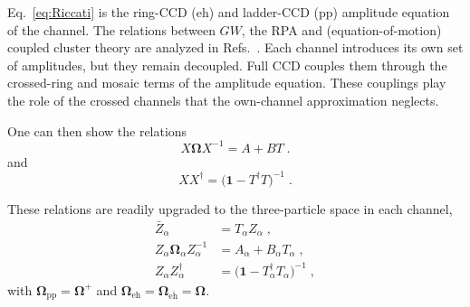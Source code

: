 \documentclass[aip,jcp,reprint,noshowkeys,superscriptaddress]{revtex4-1}
\newcommand{\bI}{\boldsymbol{1}}
\newcommand{\eh}{\text{eh}}
\newcommand{\teh}{\overline{\text{eh}}}
\newcommand{\pp}{\text{pp}}
\begin{document}
Eq.~\eqref{eq:Riccati} is
the ring-CCD ($\eh$) and ladder-CCD ($\pp$) amplitude equation of the
channel.\cite{Scuseria2013} The relations between $GW$, the RPA and
(equation-of-motion) coupled cluster theory are analyzed in
Refs.~.
Each channel introduces its own set of
amplitudes, but they remain decoupled.
Full CCD couples them through the
crossed-ring and mosaic terms of the amplitude
equation.\cite{Shepherd2014}
These couplings play the role of the crossed channels
that the own-channel approximation neglects.

One can then show the relations
\begin{equation}
X\boldsymbol\Omega X^{-1}
=
A+B T \;.
\label{eq:ZOmegaZ}
\end{equation}
and
\begin{equation}
XX^\dagger
=
\big(\bI-T^\dagger T\big)^{-1} \;.
\label{eq:X_norm}
\end{equation}

These relations are readily upgraded to the three-particle space 
in each channel,
\begin{equation}
\begin{aligned}
\bar Z_\alpha
&=
T_\alpha Z_\alpha \;,
\\
Z_\alpha\boldsymbol\Omega_\alpha Z_\alpha^{-1}
&=
A_\alpha+B_\alpha T_\alpha \;,
\\
Z_\alpha Z_\alpha^\dagger
&=
\big(\bI-T_\alpha^\dagger T_\alpha\big)^{-1} \;,
\end{aligned}
\label{eq:three_line_T}
\end{equation}
with $\boldsymbol\Omega_{\pp}=\boldsymbol\Omega^+$ and
$\boldsymbol\Omega_{\eh}=\boldsymbol\Omega_{\teh}=\boldsymbol\Omega$.
\end{document}
